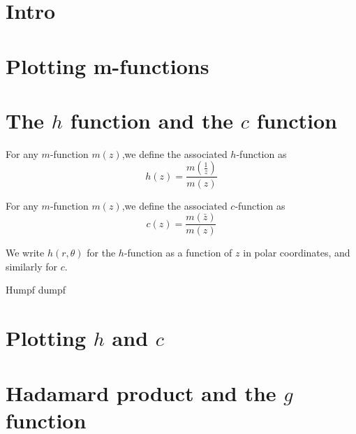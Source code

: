 \documentclass[a4paper]{amsart}
\begin{document}
\section{Intro}


\section{Plotting m-functions}


\section{The $h$ function and the $c$ function}

\begin{definition}
For any $m$-function $m(z)$,we define the associated $h$-function as
$$ h(z) = \frac{m(\frac{1}{z})}{m(z) }  $$

\end{definition}

\begin{definition}
For any $m$-function $m(z)$,we define the associated $c$-function as
$$c(z) = \frac{m(\bar{z})}{m(z)}$$

\end{definition}

We write $h(r, \theta)$ for the $h$-function as a function of $z$ in polar coordinates, and similarly for $c$.

\begin{proposition}
Humpf dumpf

\end{proposition}

\section{Plotting $h$ and $c$}




\section{Hadamard product and the $g$ function}
\end{document}
